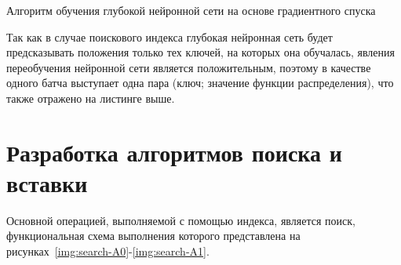 \begin{algorithm}[H]
    \caption{Алгоритм обучения глубокой нейронной сети на основе градиентного
    спуска}
    \label{alg:sdg}
    \small




\end{algorithm}

Так как в случае поискового индекса глубокая нейронная сеть будет предсказывать
положения только тех ключей, на которых она обучалась, явления переобучения
нейронной сети является положительным, поэтому в качестве одного батча выступает
одна пара (ключ; значение функции распределения), что также отражено на листинге
выше.

\section{Разработка алгоритмов поиска и вставки}
Основной операцией, выполняемой с помощью индекса, является поиск,
функциональная схема выполнения которого представлена на
рисунках~\ref{img:search-A0}-\ref{img:search-A1}.

